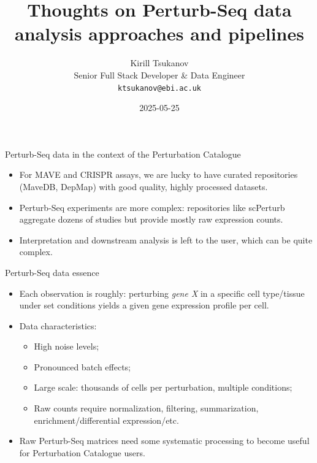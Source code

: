 \documentclass[handout]{beamer}
\title{Thoughts on Perturb-Seq data analysis approaches and pipelines}
\date{2025-05-25}
\author{Kirill Tsukanov \\ Senior Full Stack Developer \& Data Engineer \\ \texttt{ktsukanov@ebi.ac.uk}}
\institute{Perturbation Catalogue WP1/2/3 Technical Meeting}
\begin{document}
\begin{frame}
    \titlepage
\end{frame}

\begin{frame}{Perturb-Seq data in the context of the Perturbation Catalogue}
    \begin{itemize}
        \item For MAVE and CRISPR assays, we are lucky to have curated repositories (MaveDB, DepMap) with good quality, highly processed datasets.
        \item Perturb-Seq experiments are more complex: repositories like scPerturb aggregate dozens of studies but provide mostly raw expression counts.
        \item Interpretation and downstream analysis is left to the user, which can be quite complex.
    \end{itemize}
\end{frame}

\begin{frame}{Perturb-Seq data essence}
    \begin{itemize}
        \item Each observation is roughly: perturbing \emph{gene X} in a specific cell type/tissue under set conditions yields a given gene expression profile per cell.
        \item Data characteristics:
        \begin{itemize}
            \item High noise levels;
            \item Pronounced batch effects;
            \item Large scale: thousands of cells per perturbation, multiple conditions;
            \item Raw counts require normalization, filtering, summarization, enrichment/differential expression/etc.
        \end{itemize}
        \item Raw Perturb-Seq matrices need some systematic processing to become useful for Perturbation Catalogue users.
    \end{itemize}
\end{frame}
\end{document}
